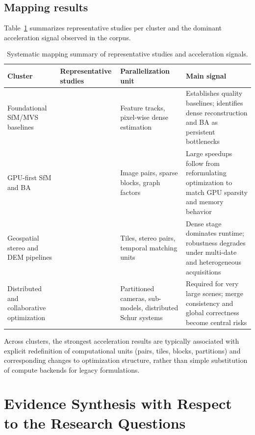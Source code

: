 \subsection{Mapping results}

Table~\ref{tab:sysmap-summary} summarizes representative studies per cluster and the dominant acceleration signal observed in the corpus.

\begin{table}[ht]
\centering
\caption{Systematic mapping summary of representative studies and acceleration signals.}
\small
\begin{tabular}{p{}p{}p{}p{}}
\hline
\textbf{Cluster} & \textbf{Representative studies} & \textbf{Parallelization unit} & \textbf{Main signal} \\
\hline
Foundational SfM/MVS baselines & \cite{Schonberger2016,Schonberger2016MVS,Galliani2015} & Feature tracks, pixel-wise dense estimation & Establishes quality baselines; identifies dense reconstruction and BA as persistent bottlenecks \\
GPU-first SfM and BA & \cite{Li2025FastMap,Zhong2025InstantSfM,Yu2025CuSfM,Safari2025,Gopinath2025} & Image pairs, sparse blocks, graph factors & Large speedups follow from reformulating optimization to match GPU sparsity and memory behavior \\
Geospatial stereo and DEM pipelines & \cite{deFranchis2014,Amadei2025,Elias2025,Masquil2026} & Tiles, stereo pairs, temporal matching units & Dense stage dominates runtime; robustness degrades under multi-date and heterogeneous acquisitions \\
Distributed and collaborative optimization & \cite{Zheng2023,Li2025BALM,Zhou2026} & Partitioned cameras, sub-models, distributed Schur systems & Required for very large scenes; merge consistency and global correctness become central risks \\
\hline
\end{tabular}
\label{tab:sysmap-summary}
\end{table}

Across clusters, the strongest acceleration results are typically associated with explicit redefinition of computational units (pairs, tiles, blocks, partitions) and corresponding changes to optimization structure, rather than simple substitution of compute backends for legacy formulations.

\section{Evidence Synthesis with Respect to the Research Questions}

